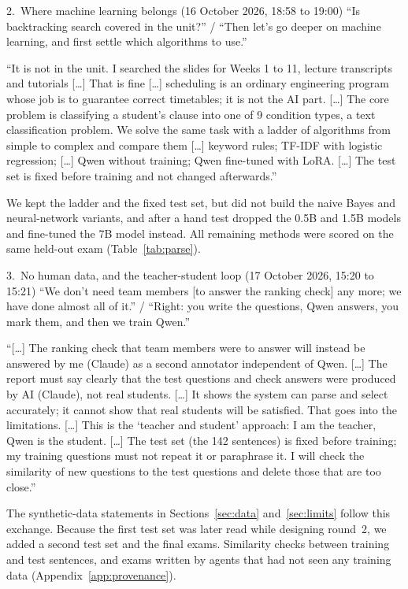 \begin{exchange}{2.\ Where machine learning belongs (16 October 2026, 18:58 to 19:00)}
 ``Is backtracking search covered in the unit?'' / ``Then let's go deeper on machine learning, and first settle which algorithms to use.''

 ``It is not in the unit. I searched the slides for Weeks 1 to 11, lecture transcripts and tutorials [\ldots] That is fine [\ldots] scheduling is an ordinary engineering program whose job is to guarantee correct timetables; it is not the AI part. [\ldots] The core problem is classifying a student's clause into one of 9 condition types, a text classification problem. We solve the same task with a ladder of algorithms from simple to complex and compare them [\ldots] keyword rules; TF-IDF with logistic regression; [\ldots] Qwen without training; Qwen fine-tuned with LoRA. [\ldots] The test set is fixed before training and not changed afterwards.''

 We kept the ladder and the fixed test set, but did not build the naive Bayes and neural-network variants, and after a hand test dropped the 0.5B and 1.5B models and fine-tuned the 7B model instead.
 All remaining methods were scored on the same held-out exam (Table~\ref{tab:parse}).
\end{exchange}

\begin{exchange}{3.\ No human data, and the teacher-student loop (17 October 2026, 15:20 to 15:21)}
 ``We don't need team members [to answer the ranking check] any more; we have done almost all of it.'' / ``Right: you write the questions, Qwen answers, you mark them, and then we train Qwen.''

 ``[\ldots] The ranking check that team members were to answer will instead be answered by me (Claude) as a second annotator independent of Qwen. [\ldots] The report must say clearly that the test questions and check answers were produced by AI (Claude), not real students. [\ldots] It shows the system can parse and select accurately; it cannot show that real students will be satisfied. That goes into the limitations. [\ldots] This is the `teacher and student' approach: I am the teacher, Qwen is the student. [\ldots] The test set (the 142 sentences) is fixed before training; my training questions must not repeat it or paraphrase it. I will check the similarity of new questions to the test questions and delete those that are too close.''

 The synthetic-data statements in Sections~\ref{sec:data} and~\ref{sec:limits} follow this exchange. Because the first test set was later read while designing round~2, we added a second test set and the final exams.
 Similarity checks between training and test sentences, and exams written by agents that had not seen any training data (Appendix~\ref{app:provenance}).
\end{exchange}

